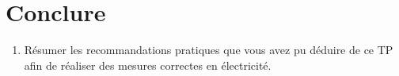 \documentclass[../main/main.tex]{subfiles}
\begin{document}
\section{Conclure}

\begin{enumerate}[label=\sqenumi, start=19]
	\item Résumer les recommandations pratiques que vous avez pu déduire de ce TP
	      afin de réaliser des mesures correctes en électricité.
\end{enumerate}
\end{document}
